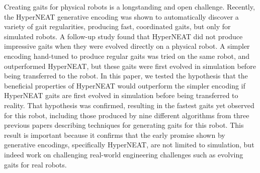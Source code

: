 Creating gaits for physical robots is a longstanding and open challenge. 
Recently, the HyperNEAT generative encoding was shown to automatically discover  a variety of gait regularities, producing fast, coordinated gaits, but only for simulated robots. A follow-up study found that HyperNEAT did not produce impressive gaits when they were evolved directly on a physical robot. A simpler encoding hand-tuned to produce regular gaits was tried on the same robot, and outperformed HyperNEAT, but these gaits were first evolved in simulation before being transferred to the robot. In this paper, we tested the hypothesis that the beneficial properties of HyperNEAT would outperform the simpler encoding if HyperNEAT gaits are first evolved in simulation before being transferred to reality. 
That hypothesis was confirmed, resulting in the fastest gaits yet observed for this robot, including those produced by nine different algorithms from three previous papers describing techniques for generating gaits for this robot. This result is important because it confirms that the early promise shown by generative encodings, specifically HyperNEAT, are not limited to simulation, but indeed work on challenging real-world engineering challenges such as evolving gaits for real robots. 




%
